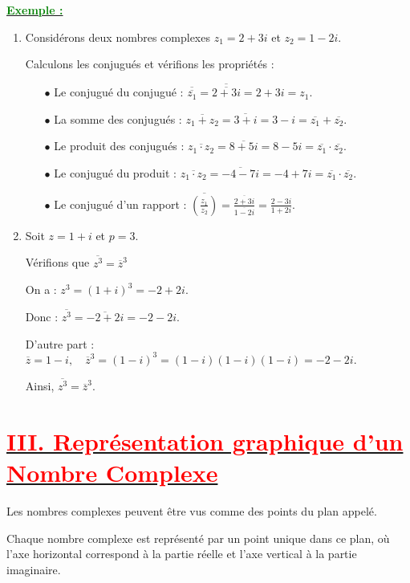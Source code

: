 \documentclass[12pt]{article}
\newcounter{exemple} %
\newcommand{\exemple}{%
  \refstepcounter{exemple}%
  \textbf{\textcolor{green}{Exemple \theexemple :}} \ignorespaces
}
\begin{document}
\underline{\exemple}

\begin{enumerate}
\item Considérons deux nombres complexes $z_1 = 2 + 3i$ et $z_2 = 1 - 2i$. 

Calculons les conjugués et vérifions les propriétés :

\begin{itemize}
\item[$\bullet$] Le conjugué du conjugué : $\overline{\overline{z_1}} = \overline{\overline{2 + 3i}} = 2 + 3i = z_1$.
\item[$\bullet$] La somme des conjugués : $\overline{z_1 + z_2} = \overline{3 + i} = 3 - i = \overline{z_1} + \overline{z_2}$.
\item[$\bullet$] Le produit des conjugués : $\overline{z_1 \cdot z_2} = \overline{8 + 5i} = 8 - 5i = \overline{z_1} \cdot \overline{z_2}$.
\item[$\bullet$] Le conjugué du produit : $\overline{z_1 \cdot z_2} = \overline{-4 - 7i} = -4 + 7i = \overline{z_1} \cdot \overline{z_2}$.
\item[$\bullet$] Le conjugué d'un rapport : $\overline{(\frac{z_1}{z_2})} = \frac{\overline{2 + 3i}}{\overline{1 - 2i}} = \frac{2 - 3i}{1 + 2i}$.

\end{itemize}
\item Soit \(z = 1 + i\) et \(p = 3\). 

Vérifions que  \(\overline{z^3} = \overline{z}^3 \)

On a :
\(
z^3 = (1 + i)^3 = -2 + 2i.
\)

Donc :
\(
\overline{z^3} = \overline{-2 + 2i} = -2 - 2i.
\)

D'autre part :
\(
\overline{z} = 1 - i, \quad \overline{z}^3 = (1 - i)^3 = (1 - i)(1 - i)(1 - i) = -2 - 2i.
\)

Ainsi, \(\overline{z^3} = \overline{z}^3\).
\end{enumerate}

\section*{\underline{\textbf{\textcolor{red}{III. Représentation graphique d'un Nombre Complexe }}}}

Les nombres complexes peuvent être vus comme des points du plan appelé.

Chaque nombre complexe est représenté par un point unique dans ce plan, où l'axe horizontal correspond à la partie réelle et l'axe vertical à la partie imaginaire.
\end{document}
